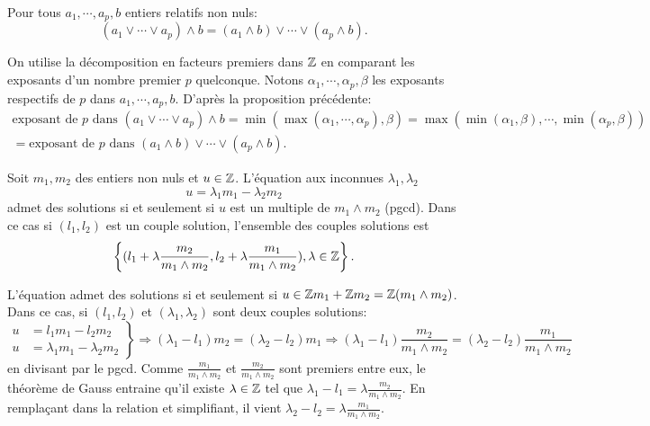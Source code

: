 \begin{propn}
  Pour tous $a_1, \cdots ,a_p, b$ entiers relatifs non nuls:
  \begin{displaymath}
    \left(a_1 \vee \cdots \vee a_p\right)\wedge b = (a_1 \wedge b) \vee \cdots \vee (a_p \wedge b).
  \end{displaymath}
\end{propn}
\begin{demo}
  On utilise la décomposition en facteurs premiers dans $\mathbb{Z}$ en comparant les exposants d'un nombre premier $p$ quelconque. Notons $\alpha_1, \cdots, \alpha_p, \beta$ les exposants respectifs de $p$ dans $a_1, \cdots, a_p, b$. D'après la proposition précédente:
  \begin{align*}
    \text{exposant de $p$ dans } \left(a_1 \vee \cdots \vee a_p\right)\wedge b 
    = \min \left( \max(\alpha_1, \cdots, \alpha_p) , \beta \right) 
    = \max\left( \min(\alpha_1, \beta), \cdots , \min(\alpha_p,\beta)\right) \\
    = \text{exposant de $p$ dans } (a_1 \wedge b) \vee \cdots \vee (a_p \wedge b).
  \end{align*}
\end{demo}

\begin{propn}
  Soit $m_1, m_2$ des entiers non nuls et $u\in \mathbb{Z}$. L'équation aux inconnues $\lambda_1, \lambda_2$
  \begin{displaymath}
    u = \lambda_1 m_1 - \lambda_2 m_2
  \end{displaymath}
  admet des solutions si et seulement si $u$ est un multiple de $m_1 \wedge m_2$ (pgcd). Dans ce cas si $(l_1, l_2)$ est un couple solution, l'ensemble des couples solutions est
  \begin{displaymath}
    \left \lbrace (l_1 + \lambda \frac{m_2}{m_1 \wedge m_2},l_2 + \lambda \frac{m_1}{m_1 \wedge m_2}), \lambda \in \mathbb{Z} \right\rbrace .
  \end{displaymath}
\end{propn}
\begin{demo}
  L'équation admet des solutions si et seulement si $u \in \mathbb{Z} m_1 + \mathbb{Z} m_2 = \mathbb{Z} (m_1\wedge m_2)$. Dans ce cas, si $(l_1,l_2)$ et $(\lambda_1, \lambda_2)$ sont deux couples solutions:
  \begin{displaymath}
    \left. 
    \begin{aligned}
      u &= l_1 m_1 - l_2 m_2 \\
      u &= \lambda_1 m_1 - \lambda_2 m_2
    \end{aligned}
    \right\rbrace \Rightarrow (\lambda_1 - l_1)m_2 = (\lambda_2 - l_2)m_1 \Rightarrow (\lambda_1 - l_1)\frac{m_2}{m_1 \wedge m_2} = (\lambda_2 - l_2)\frac{m_1}{m_1 \wedge m_2}
  \end{displaymath}
en divisant par le pgcd. Comme $\frac{m_1}{m_1 \wedge m_2}$ et $\frac{m_2}{m_1 \wedge m_2}$ sont premiers entre eux, le théorème de Gauss entraine qu'il existe $\lambda \in \mathbb{Z}$ tel que $\lambda_1 - l_1 = \lambda \frac{m_2}{m_1 \wedge m_2}$. En remplaçant dans la relation et simplifiant, il vient $\lambda_2 - l_2 = \lambda \frac{m_1}{m_1 \wedge m_2}$.
\end{demo}

